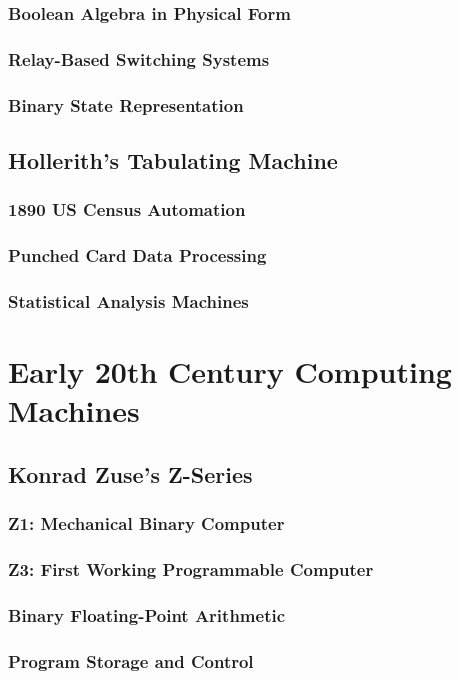 \documentclass[12pt, oneside, openany]{book}
\begin{document}
\subsubsection{Boolean Algebra in Physical Form}
\subsubsection{Relay-Based Switching Systems}
\subsubsection{Binary State Representation}

\subsection{Hollerith's Tabulating Machine}
\subsubsection{1890 US Census Automation}
\subsubsection{Punched Card Data Processing}
\subsubsection{Statistical Analysis Machines}

\section{Early 20th Century Computing Machines}
\subsection{Konrad Zuse's Z-Series}
\subsubsection{Z1: Mechanical Binary Computer}
\subsubsection{Z3: First Working Programmable Computer}
\subsubsection{Binary Floating-Point Arithmetic}
\subsubsection{Program Storage and Control}
\end{document}
